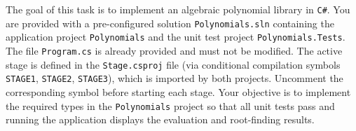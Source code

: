 \documentclass[11pt,a4paper,addpoints]{exam}
\begin{document}
\cellwidth{2.75cm}
\noindent \gradetable[h]

\vspace{0.4cm}

The goal of this task is to implement an algebraic polynomial library in \texttt{C\#}.
You are provided with a pre-configured solution \texttt{Polynomials.sln} containing the application project \texttt{Polynomials} and the unit test project \texttt{Polynomials.Tests}.
The file \texttt{Program.cs} is already provided and must not be modified.
The active stage is defined in the \texttt{Stage.csproj} file (via conditional compilation symbols \texttt{STAGE1}, \texttt{STAGE2}, \texttt{STAGE3}), which is imported by both projects. Uncomment the corresponding symbol before starting each stage.
Your objective is to implement the required types in the \texttt{Polynomials} project so that all unit tests pass and running the application displays the evaluation and root-finding results.
\end{document}

